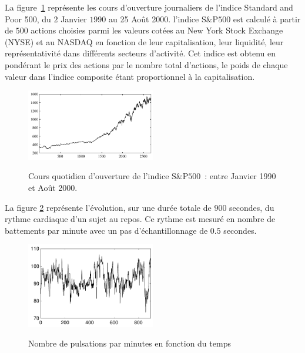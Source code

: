 \begin{example}
La figure~\ref{fig:SP} repr\'esente les cours d'ouverture
journaliers de l'indice Standard and Poor 500, du $2$ Janvier
$1990$ au 25 Ao\^ut 2000. l'indice S\&P$500$ est calcul\'e \`a
partir de $500$ actions choisies parmi les valeurs cot\'ees au New
York Stock Exchange (NYSE) et au NASDAQ en fonction de leur
capitalisation, leur liquidit\'e, leur repr\'esentativit\'e dans
diff\'erents secteurs d'activit\'e. Cet indice est obtenu en pond\'erant
le prix des actions par le nombre total d'actions, le poids de
chaque valeur dans l'indice composite \'etant proportionnel \`a la
capitalisation.
\begin{figure}
  \centering
  \includegraphics[width=0.5\textwidth]{Figures/SP}\\
  \caption{Cours quotidien d'ouverture de l'indice S\&P$500$~:
 entre Janvier 1990 et Ao\^ut 2000.}\label{fig:SP}
\end{figure}
\end{example}
\begin{example}
  La figure \ref{fig:figcard1} représente l'évolution, sur une
  durée totale de $900$ secondes, du rythme cardiaque d'un sujet au repos.
  Ce rythme est mesuré en nombre de battements par minute avec un pas d'échantillonnage de $0.5$
  secondes.
\begin{figure}
\label{fig:figcard1}
\centering
\includegraphics[width=0.5\textwidth]{Figures/hr11839}\\
\caption{Nombre de pulsations par minutes en fonction du temps}
\end{figure}
\end{example}
